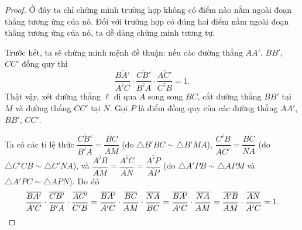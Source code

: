         \begin{proof}
            Ở đây ta chỉ chứng minh trường hợp không có điểm nào nằm ngoài đoạn thẳng tương ứng của nó. Đối với trường hợp có đúng hai điểm nằm ngoài đoạn thẳng tương ứng của nó, ta dễ dàng chứng minh tương tự.
            
            Trước hết, ta sẽ chứng minh mệnh đề thuận: nếu các đường thẳng \(AA'\), \(BB'\), \(CC'\) đồng quy thì
            \[\frac{\overline{BA'}}{\overline{A'C}} \cdot \frac{\overline{CB'}}{\overline{B'A}} \cdot \frac{\overline{AC'}}{\overline{C'B}} = 1.\]
            Thật vậy, xét đường thẳng \(\ell\) đi qua \(A\) song song \(BC\), cắt đường thẳng \(BB'\) tại \(M\) và đường thẳng \(CC'\) tại \(N\). Gọi \(P\) là điểm đồng quy của các đường thẳng \(AA'\), \(BB'\), \(CC'\).

            Ta có các tỉ lệ thức
            \(\dfrac{\overline{CB'}}{\overline{B'A}} = \dfrac{\overline{BC}}{\overline{AM}}\) (do \(\triangle B'BC \sim \triangle B'MA\)),
            \(\dfrac{\overline{C'B}}{\overline{AC'}} = \dfrac{\overline{BC}}{\overline{NA}}\) (do \(\triangle C'CB \sim \triangle C'NA\)),
            và \(\dfrac{\overline{A'B}}{\overline{AM}} = \dfrac{\overline{A'C}}{\overline{AN}} = \dfrac{\overline{A'P}}{\overline{AP}}\) (do \(\triangle A'PB \sim \triangle APM\) và \(\triangle A'PC \sim \triangle APN\)). Do đó
            \[
            \frac{\overline{BA'}}{\overline{A'C}} \cdot \frac{\overline{CB'}}{\overline{B'A}} \cdot \frac{\overline{AC'}}{\overline{C'B}}
            = \frac{\overline{BA'}}{\overline{A'C}} \cdot \frac{\overline{BC}}{\overline{AM}} \cdot \frac{\overline{NA}}{\overline{BC}} \\
            = \frac{\overline{BA'}}{\overline{A'C}} \cdot \frac{\overline{NA}}{\overline{AM}} 
            = \frac{\overline{A'B}}{\overline{AM}} \cdot \frac{\overline{AN}}{\overline{A'C}} = 1.
            \]


\end{proof}
